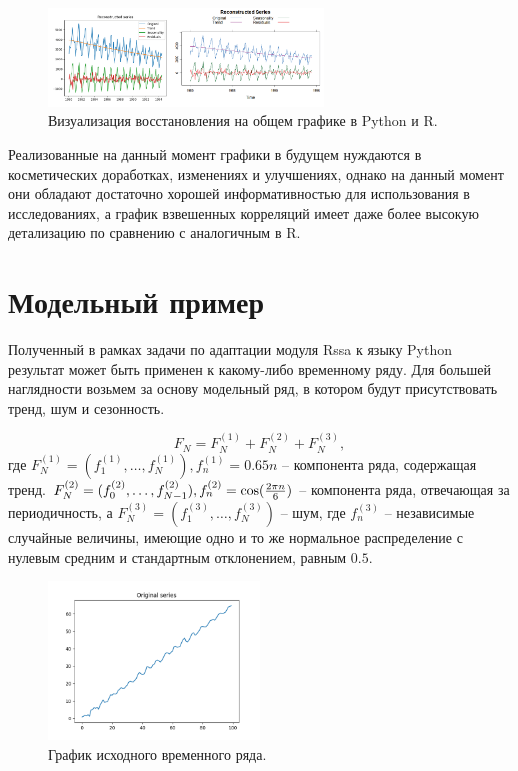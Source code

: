 \documentclass[specialist,
			   substylefile = spbu_report.rtx,
			   subf,href,colorlinks=true, 12pt]{disser}
\begin{document}
\begin{figure}[htp]
	\centering
	\includegraphics[width=0.65\textwidth]{rpy_rec_superpose}
	\caption{Визуализация восстановления на общем графике в Python и R.}
	\label{fig:rpy_rec_superpose}
\end{figure}

Реализованные на данный момент графики в будущем нуждаются в косметических доработках, изменениях и улучшениях, однако на данный момент они обладают достаточно хорошей информативностью для использования в исследованиях, а график взвешенных корреляций имеет даже более высокую детализацию по сравнению с аналогичным в R.

\section{Модельный пример}

Полученный в рамках задачи по адаптации модуля Rssa к языку Python результат может быть применен к какому-либо временному ряду. Для большей наглядности возьмем за основу модельный ряд, в котором будут присутствовать тренд, шум и сезонность. 

\begin{equation*}
	F_N = F_N^{(1)} + F_N^{(2)} + F_N^{(3)},
\end{equation*}
где $F_N^{(1)} = (f_1^{(1)}, \dots, f_{N}^{(1)}), f_n^{(1)} = 0.65 n$ – компонента ряда, содержащая тренд. $F_N^{(2)} = (f_0^{(2)}, \dots, f_{N-1}^{(2)}), f_n^{(2)} = \cos({2 \pi n \over 6})$ – компонента ряда, отвечающая за периодичность, а $F_N^{(3)} = (f_1^{(3)}, \dots, f_{N}^{(3)})$ – шум, где $f_n^{(3)}$ – независимые случайные величины, имеющие одно и то же нормальное распределение с нулевым средним и стандартным отклонением, равным $0.5$.

\begin{figure}[H]
	\centering
	\includegraphics[width=0.5\textwidth]{mpy_orig}
	\caption{График исходного временного ряда.}
	\label{fig:mpy_orig}
\end{figure}
\end{document}
